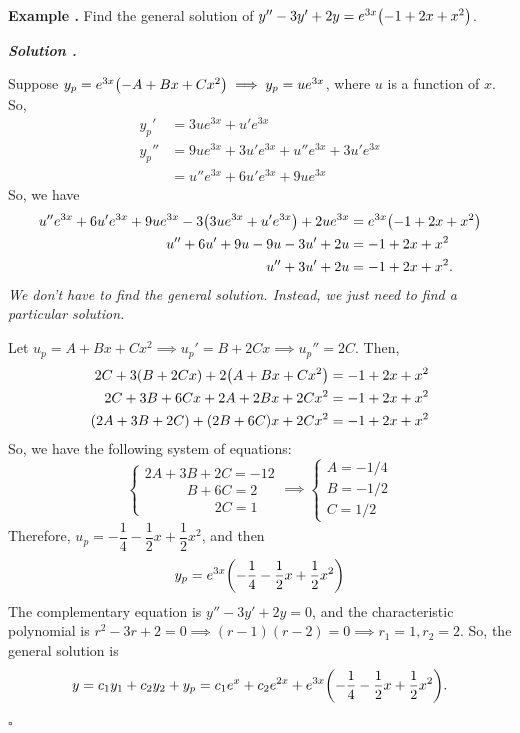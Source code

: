 \documentclass[12pt, a4paper]{article}
\newcounter{index}[subsection]
\newenvironment*{eg}{\begin{framed}\par\noindent\textbf{Example \thesubsection.\stepcounter{index}\theindex}}{\par\end{framed}}
\newcounter{nprf}[subsection]
\newenvironment*{sol}{\par\indent\textbf{\textit{Solution \stepcounter{nprf}\thenprf.}}\par}{\hfill{$\square$}\par}
\def\C{{\mathbb{C}}}
\begin{document}
\begin{eg}
	Find the general solution of $y''-3y'+2y=e^{3x}\qty(-1+2x+x^2)$.
	\begin{sol}
		Suppose $y_p=e^{3x}\qty(-A+Bx+Cx^2)\implies y_p=ue^{3x}$, where $u$ is a function of $x$. So, \begin{align*}y_p'&=3ue^{3x}+u'e^{3x}\\y_p''&=9ue^{3x}+3u'e^{3x}+u''e^{3x}+3u'e^{3x}\\&=u''e^{3x}+6u'e^{3x}+9ue^{3x}\end{align*} So, we have \begin{align*}u''e^{3x}+6u'e^{3x}+9ue^{3x}-3\qty(3ue^{3x}+u'e^{3x})+2ue^{3x}&=e^{3x}\qty(-1+2x+x^2)\\u''+6u'+9u-9u-3u'+2u&=-1+2x+x^2\\u''+3u'+2u&=-1+2x+x^2.\end{align*}\textit{We don't have to find the general solution. Instead, we just need to find a particular solution.}\par Let $u_p=A+Bx+Cx^2\implies u_p'=B+2Cx\implies u_p''=2C$. Then, \begin{align*}2C+3(B+2Cx)+2\qty(A+Bx+Cx^2)&=-1+2x+x^2\\2C+3B+6Cx+2A+2Bx+2Cx^2&=-1+2x+x^2\\(2A+3B+2C)+(2B+6C)x+2Cx^2&=-1+2x+x^2\end{align*} So, we have the following system of equations: \[\begin{cases}2A+3B+2C=-12\\\qquad\quad B+6C=2\\\qquad\qquad\quad 2C=1\end{cases}\implies\begin{cases}A=-1/4\\B=-1/2\\C=1/2\end{cases}\] Therefore, $u_p=-\dfrac{1}{4}-\dfrac{1}{2}x+\dfrac{1}{2}x^2$, and then \[y_p=e^{3x}\qty(-\dfrac{1}{4}-\dfrac{1}{2}x+\dfrac{1}{2}x^2)\] The complementary equation is $y''-3y'+2y=0$, and the characteristic polynomial is $r^2-3r+2=0\implies(r-1)(r-2)=0\implies r_1=1, r_2=2$. So, the general solution is \[y=c_1y_1+c_2y_2+y_p=c_1e^{x}+c_2e^{2x}+e^{3x}\qty(-\dfrac{1}{4}-\dfrac{1}{2}x+\dfrac{1}{2}x^2). \]
	\end{sol}
\end{eg}
\end{document}
